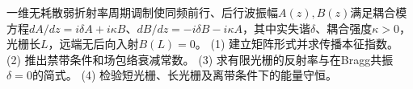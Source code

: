 一维无耗散弱折射率周期调制使同频前行、后行波振幅\(A(z),B(z)\)满足耦合模方程\(dA/dz=i\delta A+i\kappa B\)、\(dB/dz=-i\delta B-i\kappa A\)，其中实失谐\(\delta\)、耦合强度\(\kappa>0\)，光栅长\(L\)，远端无后向入射\(B(L)=0\)。
(1) 建立矩阵形式并求传播本征指数。
(2) 推出禁带条件和场包络衰减常数。
(3) 求有限光栅的反射率与在Bragg共振\(\delta=0\)的简式。
(4) 检验短光栅、长光栅及离带条件下的能量守恒。
